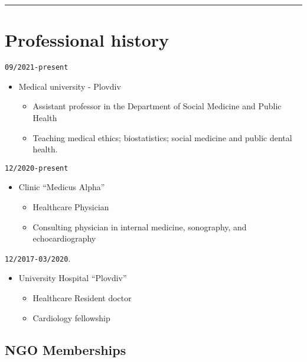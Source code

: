 \documentclass[
  12pt,
  letterpaper,
  DIV=11,
  numbers=noendperiod]{scrartcl}
\providecommand{\tightlist}{%
  \setlength{\itemsep}{0pt}\setlength{\parskip}{0pt}}\usepackage{longtable,booktabs,array}
\begin{document}
\begin{center}\rule{0.5\linewidth}{0.5pt}\end{center}

\section{Professional history}\label{professional-history}

\texttt{09/2021-present}

\begin{itemize}
\tightlist
\item
  Medical university - Plovdiv

  \begin{itemize}
  \tightlist
  \item
    Assistant professor in the Department of Social Medicine and Public
    Health
  \item
    Teaching medical ethics; biostatistics; social medicine and public
    dental health.
  \end{itemize}
\end{itemize}

\texttt{12/2020-present}

\begin{itemize}
\tightlist
\item
  Clinic ``Medicus Alpha''

  \begin{itemize}
  \tightlist
  \item
    Healthcare \textbar{} Physician
  \item
    Consulting physician in internal medicine, sonography, and
    echocardiography
  \end{itemize}
\end{itemize}

\texttt{12/2017-03/2020}.

\begin{itemize}
\tightlist
\item
  University Hospital ``Plovdiv''

  \begin{itemize}
  \tightlist
  \item
    Healthcare \textbar{} Resident doctor
  \item
    Cardiology fellowship
  \end{itemize}
\end{itemize}

\subsection{NGO Memberships}\label{ngo-memberships}
\end{document}
